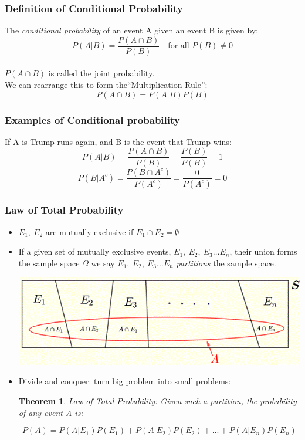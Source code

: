 \documentclass[aspectratio=169, handout]{beamer}
\newtheorem{thm}{Theorem}
\numberwithin{equation}{section}
\begin{document}
\begin{frame}
\frametitle{Definition of Conditional Probability}
The \emph{conditional probability} of an event A given an event B is given by:
$$P(A|B)=\frac{P(A\cap B)}{P(B)}\quad \text{for all }P(B)\neq 0$$
\\
$P(A\cap B)$ is called the joint probability.\\
\pause We can rearrange this to form the``Multiplication Rule'':
$$P(A\cap B)=P(A|B)P(B)$$

\end{frame}


\begin{frame}
\frametitle{Examples of Conditional probability}
If A is Trump runs again, and B is the event that Trump wins:
$$P(A|B)=\frac{P(A\cap B)}{P(B)}=\frac{P(B)}{P(B)}=1$$\pause
$$P(B|A^c)=\frac{P(B\cap A^c)}{P(A^c)}=\frac{0}{P(A^c)}=0$$

\end{frame}



\begin{frame}
\frametitle{Law of Total Probability}

\begin{itemize}
\item $E_1,\  E_2$ are mutually exclusive if $E_1\cap E_2=\emptyset$

\item If a given set of mutually exclusive events, $E_1,\  E_2,\ E_3\ldots E_n$, their union forms the sample space $\Omega$ we say $E_1,\  E_2,\ E_3 \ldots E_n$ \emph{partitions} the sample space. \\ 
\begin{center}
\includegraphics[width=2.5 in]{images/law-total-probability-diagram.png}
\end{center}
\item Divide and conquer: turn big problem into small problems:
\begin{thm}
Law of Total Probability: 
Given such a partition, the probability of any event A is:

$$P(A)= P(A|E_1)P(E_1)+P(A|E_2)P(E_2)+...+P(A|E_n)P(E_n)$$
\end{thm}
\end{itemize}

\end{frame}
\end{document}
